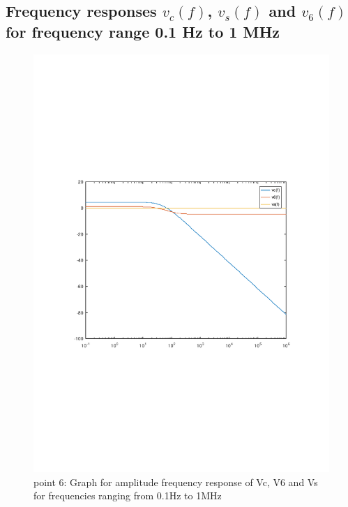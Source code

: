 \subsection{Frequency responses $v_c(f)$, $v_s(f)$ and $v_6(f)$ for frequency range 0.1 Hz to 1 MHz}
\begin{figure}[H] \centering
\includegraphics[width=0.9\linewidth]{freq_resp_tab.pdf}
\caption{point 6: Graph for amplitude frequency response of Vc, V6 and Vs for frequencies ranging from 0.1Hz to 1MHz}
\label{fig:freq_resp}
\end{figure}



